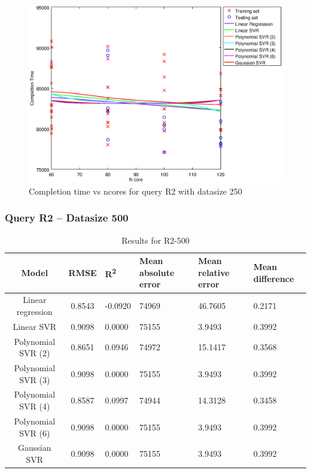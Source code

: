 \documentclass[a4paper,11pt]{article}
\begin{document}
\begin {figure}[hbtp]
\centering
\includegraphics[width=\textwidth]{output/R2_250_ONLY_1_LINEAR_NCORE/plot_R2_250.eps}
\caption{Completion time vs ncores for query R2 with datasize 250}
\label{fig:coreonly_linear_R2_250}
\end {figure}

\newpage
\subsubsection{Query R2 -- Datasize 500}
\begin{table}[H]
	\centering
	\begin{adjustbox}{center}
		\begin{tabular}{c | c M{1.2cm} M{2.5cm} M{2.5cm} M{1.8cm}}
			Model & RMSE & R\textsuperscript{2} & Mean absolute error & Mean relative error & Mean difference \tabularnewline
			\hline
			Linear regression & 0.8543 & -0.0920 &  74969 & 46.7605 & 0.2171 \\
			Linear SVR & 0.9098 & 0.0000 &  75155 & 3.9493 & 0.3992 \\
			Polynomial SVR (2) & 0.8651 & 0.0946 &  74972 & 15.1417 & 0.3568 \\
			Polynomial SVR (3) & 0.9098 & 0.0000 &  75155 & 3.9493 & 0.3992 \\
			Polynomial SVR (4) & 0.8587 & 0.0997 &  74944 & 14.3128 & 0.3458 \\
			Polynomial SVR (6) & 0.9098 & 0.0000 &  75155 & 3.9493 & 0.3992 \\
			Gaussian SVR & 0.9098 & 0.0000 &  75155 & 3.9493 & 0.3992 \\
		\end{tabular}
	\end{adjustbox}
	\\
	\caption{Results for R2-500}
	\label{fig:coreonly_linear_R2_500}
\end{table}
\end{document}
